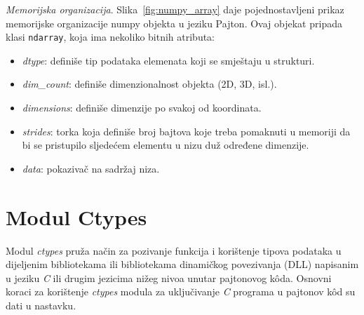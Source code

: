  \textit{Memorijska organizacija}. Slika~\ref{fig:numpy_array} daje pojednostavljeni prikaz memori\-jske organizacije numpy objekta u jeziku Pajton.  Ovaj objekat pripada klasi \texttt{ndarray}, koja ima nekoliko bitnih atributa: 
 \begin{itemize}
 	\item \textit{dtype}: definiše tip podataka elemenata koji se smještaju u stru\-kturi.
 	\item \textit{dim\_count}: definiše dimenzionalnost objekta (2D, 3D, isl.).  
 	\item \textit{dimensions}: definiše dimenzije po svakoj od koordinata.  
 	\item \textit{strides}: torka koja definiše broj bajtova koje treba pomaknuti u memoriji da bi se pristupilo sljedećem elementu u nizu duž određene dimenzije. %
 	\item \textit{data}: pokazivač na sadržaj niza. 
 \end{itemize} 
 

\section{Modul Ctypes}

Modul \textit{ctypes} pruža način za pozivanje funkcija i korištenje tipova podataka u dijeljenim  bibliotekama ili bibliotekama dinamičkog povezi\-vanja (DLL) napisanim u jeziku \textit{C} ili drugim jezicima nižeg nivoa unutar pajtonovog k\^oda. Osnovni  koraci za korištenje \textit{ctypes} modula za uključivanje \textit{C} programa u pajtonov k\^od su dati u nastavku.

